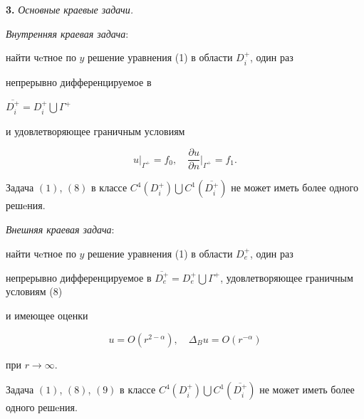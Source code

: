 {\bf 3.} {\it Основные краевые задачи.}


{\it Внутренняя краевая задача}:


найти чeтное по $y$ решение уравнения (1) в области $D_{i}^{+}$, один раз


непрерывно дифференцируемое в


$\overline{D_{i}^{+}}=D_{i}^{+}\bigcup\Gamma^{+}$


и удовлетворяющее граничным условиям


\begin{equation}


u\big |_{\Gamma^{+}}=f_{0},\quad


\frac{\partial u}{\partial n}\bigg|_{\Gamma^{+}}=f_{1}.


\end{equation}





\begin{thm}


Задача $(1)$, $(8)$ в классе $C^{4}(D_{i}^{+})\bigcup 


C^{1}(\overline{D_{i}^{+}})$ не может иметь более одного решeния.


\end{thm}





{\it Внешняя краевая задача}:


найти чeтное по $y$ решение уравнения (1) в области $D_{e}^{+}$, один раз 


непрерывно дифференцируемое в $\overline{D_{e}^{+}}= D_{e}^{+}\bigcup


\Gamma^{+}$, удовлетворяющее граничным условиям (8)


и имеющее оценки


\begin{equation}


u=O(r^{2-\alpha}), \quad \Delta_{B}u=O(r^{-\alpha})


\end{equation}


при $r\to\infty$.





\begin{thm}


Задача $(1)$, $(8)$, $(9)$ в классе $C^{4}(D_{i}^{+})\bigcup


C^{1}(\overline{D_{i}^{+}})$ не может иметь более одного решeния.


\end{thm}





